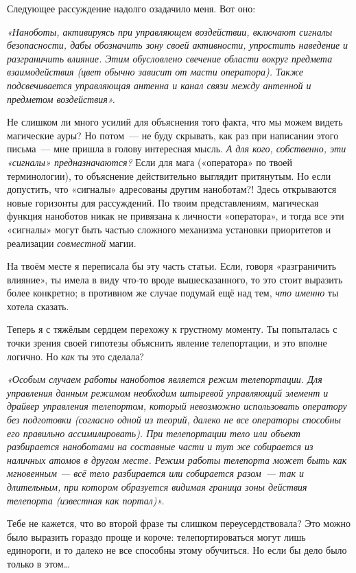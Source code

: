 \documentclass[fontsize=11pt,a5paper,titlepage=firstcover]{scrbook}
\begin{document}
Следующее рассуждение надолго озадачило меня. Вот оно:

\emph{«Наноботы, активируясь при управляющем воздействии, включают сигналы безопасности, дабы обозначить зону своей активности, упростить наведение и разграничить влияние. Этим обусловлено свечение области вокруг предмета взаимодействия (цвет обычно зависит от масти оператора). Также подсвечивается управляющая антенна и канал связи между антенной и предметом воздействия».}

Не слишком ли много усилий для объяснения того факта, что мы можем видеть магические ауры? Но потом~--- не буду скрывать, как раз при написании этого письма~--- мне пришла в голову интересная мысль. \emph{А для кого, собственно, эти «сигналы» предназначаются?} Если для мага («оператора» по твоей терминологии), то объяснение действительно выглядит притянутым. Но если допустить, что «сигналы» адресованы другим наноботам?! Здесь открываются новые горизонты для рассуждений. По твоим представлениям, магическая функция наноботов никак не привязана к личности «оператора», и тогда все эти «сигналы» могут быть частью сложного механизма установки приоритетов и реализации \emph{совместной} магии.

На твоём месте я переписала бы эту часть статьи. Если, говоря «разграничить влияние», ты имела в виду что-то вроде вышесказанного, то это стоит выразить более конкретно; в противном же случае подумай ещё над тем, \emph{что именно} ты хотела сказать.

Теперь я с тяжёлым сердцем перехожу к грустному моменту. Ты попыталась с точки зрения своей гипотезы объяснить явление телепортации, и это вполне логично. Но \emph{как} ты это сделала?

\emph{«Особым случаем работы наноботов является режим телепортации. Для управления данным режимом необходим штыревой управляющий элемент и драйвер управления телепортом, который невозможно использовать оператору без подготовки (согласно одной из теорий, далеко не все операторы способны его правильно ассимилировать). При телепортации тело или объект разбирается наноботами на составные части и тут же собирается из наличных атомов в другом месте. Режим работы телепорта может быть как мгновенным --- всё тело разбирается или собирается разом~--- так и длительным, при котором образуется видимая граница зоны действия телепорта (известная как портал)».}

Тебе не кажется, что во второй фразе ты слишком переусердствовала? Это можно было выразить гораздо проще и короче: телепортироваться могут лишь единороги, и то далеко не все способны этому обучиться. Но если бы дело было только в этом{\ldots}
\end{document}
